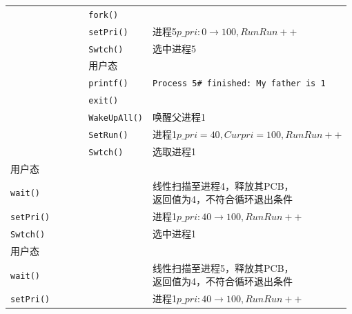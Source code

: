 \begin{landscape}
\begin{longtable}{llllll}
                &                      &     &                &              \texttt{fork()}    &\\
                 &                      &     &                &              \texttt{setPri()}    &进程5$p\_pri:0\rightarrow 100,RunRun++$ \\
                 &                      &     &                &              \texttt{Swtch()}     &选中进程5 \\
                 &                      &     &                &             用户态    & \\
                 &                      &     &                &            \texttt{printf()}    & \texttt{Process 5\# finished: My father is 1}\\
                 &                      &     &                &            \texttt{exit()}    & \\
                 &                      &     &                &            \texttt{WakeUpAll()} &唤醒父进程1 \\
                 &                      &     &                &            \texttt{SetRun()} & 进程1$p\_pri=40,Curpri=100,RunRun++$\\
                 &                      &     &                &            \texttt{Swtch()}    & 选取进程1\\
用户态           &                       &          &           &             &            \\
   \texttt{wait()} &                  &                &           &             &\makecell[l]{线性扫描至进程4，释放其PCB，\\返回值为4，不符合循环退出条件}\\
    \texttt{setPri()} &                  &                &           &             &进程1$p\_pri:40\rightarrow 100,RunRun++$\\
    \texttt{Swtch()} &                  &                &           &             &选中进程1\\
用户态           &                       &          &           &             &            \\
    \texttt{wait()} &                  &                &           &             &\makecell[l]{线性扫描至进程5，释放其PCB，\\返回值为4，不符合循环退出条件}\\
    \texttt{setPri()} &                  &                &           &             &进程1$p\_pri:40\rightarrow 100,RunRun++$\\

\end{longtable}
\end{landscape}
